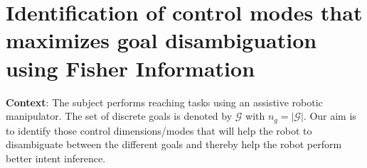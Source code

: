 \documentclass[]{article}
\begin{document}
%
%
%
%
%

\pagebreak

\section*{Identification of control modes that maximizes goal disambiguation using Fisher Information}

\textbf{Context}: The subject performs reaching tasks using an assistive robotic manipulator. The set of discrete goals is denoted by $\mathcal{G}$ with $n_g = |\mathcal{G}|$. Our aim is to identify those control dimensions/modes that will help the robot to disambiguate between the different goals and thereby help the robot perform better intent inference. 
\end{document}
